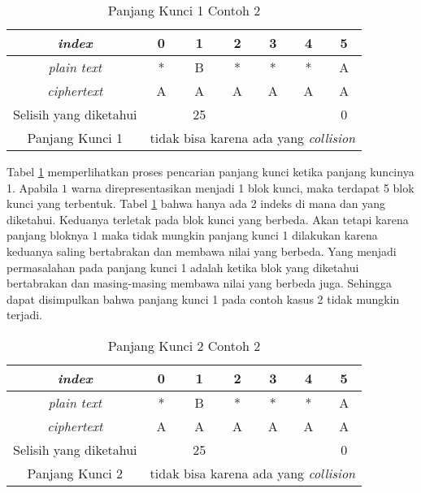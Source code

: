 	\begin{table}[H]
	 	\centering
	 	\caption{Panjang Kunci 1 Contoh 2}
	 	\setlength{\arrayrulewidth}{.08em}
	 	\begin{tabular}{|c|c|c|c|c|c|c|}\hline
		\textit{index}&0&1&2&3&4&5\\ \hline
	 	\textit{plain text}&\cellcolor{blue!15}*&\cellcolor{yellow!25}B&\cellcolor{green!15}*&\cellcolor{lime!25}*&\cellcolor{pink!30}*&\cellcolor{red!25}A\\ \hline
	 	\textit{ciphertext}&\cellcolor{blue!15}A&\cellcolor{yellow!25}A&\cellcolor{green!15}A&\cellcolor{lime!25}A&\cellcolor{pink!30}A&\cellcolor{red!25}A\\ \hline
	 	Selisih yang diketahui& &25& & & &0\\ \hline
	 	Panjang Kunci 1 & \multicolumn{6}{c|}{tidak bisa karena ada yang \textit{collision}}\\ \hline
	 	\end{tabular}
	 	\label{tab:k1contoh2}
	\end{table}	
	
	Tabel \ref{tab:k1contoh2} memperlihatkan proses pencarian panjang kunci ketika panjang kuncinya 1. Apabila $1$ warna direpresentasikan menjadi 1 blok kunci, maka terdapat 5 blok kunci yang terbentuk. Tabel \ref{tab:k1contoh2} bahwa hanya ada 2 indeks di mana \plaintext dan \ciphertext yang diketahui. Keduanya terletak pada blok kunci yang berbeda. Akan tetapi karena panjang bloknya $1$ maka tidak mungkin panjang kunci 1 dilakukan karena keduanya saling bertabrakan dan membawa nilai yang berbeda. Yang menjadi permasalahan pada panjang kunci 1 adalah ketika blok yang diketahui bertabrakan dan masing-masing membawa nilai yang berbeda juga. Sehingga dapat disimpulkan bahwa panjang kunci 1 pada contoh kasus 2 tidak mungkin terjadi.
	\\
	
	\begin{table}[H]
	 	\centering
	 	\caption{Panjang Kunci 2 Contoh 2}
	 	\setlength{\arrayrulewidth}{.08em}
	 	\begin{tabular}{|c|c|c|c|c|c|c|}\hline
		\textit{index}&0&1&2&3&4&5\\ \hline
	 	\textit{plain text}&\cellcolor{blue!15}*&\cellcolor{blue!15}B&\cellcolor{green!15}*&\cellcolor{green!15}*&\cellcolor{pink!30}*&\cellcolor{pink!30}A\\ \hline
	 	\textit{ciphertext}&\cellcolor{blue!15}A&\cellcolor{blue!15}A&\cellcolor{green!15}A&\cellcolor{green!15}A&\cellcolor{pink!30}A&\cellcolor{pink!30}A\\ \hline
	 	Selisih yang diketahui& &25& & & &0\\ \hline
	 	Panjang Kunci 2 & \multicolumn{6}{c|}{tidak bisa karena ada yang \textit{collision}}\\ \hline
	 	\end{tabular}
	 	\label{tab:k2contoh2}
	\end{table}	
	
